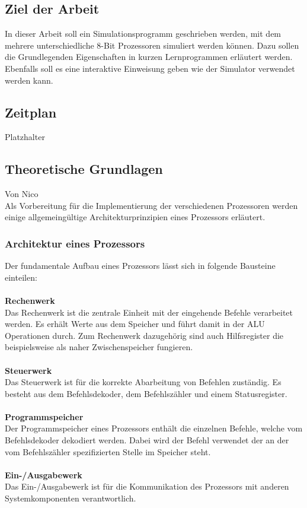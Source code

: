 \documentclass[12pt]{article}
\begin{document}
\subsection{Ziel der Arbeit}
In dieser Arbeit soll ein Simulationsprogramm geschrieben werden, mit dem mehrere unterschiedliche 8-Bit Prozessoren simuliert werden können. Dazu sollen die Grundlegenden Eigenschaften in kurzen Lernprogrammen erläutert werden. Ebenfalls soll es eine interaktive Einweisung geben wie der Simulator verwendet werden kann.

\subsection{Zeitplan}
Platzhalter

\newpage

\subsection{Theoretische Grundlagen}
Von Nico\\
\noindent
Als Vorbereitung für die Implementierung der verschiedenen Prozessoren werden einige allgemeingültige Architekturprinzipien eines Prozessors erläutert. 

\subsubsection{Architektur eines Prozessors}
Der fundamentale Aufbau eines Prozessors lässt sich in folgende Bausteine einteilen:\\ \\
\textbf{Rechenwerk}\\
Das Rechenwerk ist die zentrale Einheit mit der eingehende Befehle verarbeitet werden. Es erhält Werte aus dem Speicher und führt damit in der ALU Operationen durch. Zum Rechenwerk dazugehörig sind auch Hilfsregister die beispielsweise als naher Zwischenspeicher fungieren.\\ \\
\textbf{Steuerwerk}\\
Das Steuerwerk ist für die korrekte Abarbeitung von Befehlen zuständig. Es besteht aus dem Befehlsdekoder, dem Befehlszähler und einem Statusregister.\\ \\
\textbf{Programmspeicher}\\
Der Programmspeicher eines Prozessors enthält die einzelnen Befehle, welche vom Befehlsdekoder dekodiert werden. Dabei wird der Befehl verwendet der an der vom Befehlszähler spezifizierten Stelle im Speicher steht.\\ \\
\textbf{Ein-/Ausgabewerk}\\
Das Ein-/Ausgabewerk ist für die Kommunikation des Prozessors mit anderen Systemkomponenten verantwortlich.\\
\end{document}
